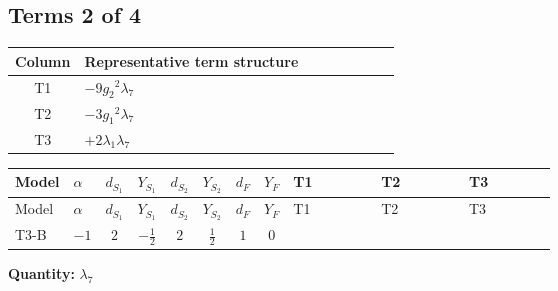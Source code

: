 \documentclass[8pt]{article}
\begin{document}
\begin{landscape}
\subsection*{Terms 2 of 4}
\begin{center}
\begin{tabular}{@{}c >{\raggedright\arraybackslash}p{0.82\linewidth}@{}}
\toprule
Column & Representative term structure \\
\midrule
T1 & \(\displaystyle -9 {g_2}^2 {\lambda_7}\) \\
\midrule
T2 & \(\displaystyle -3 {g_1}^2 {\lambda_7}\) \\
\midrule
T3 & \(\displaystyle +2 {\lambda_1} {\lambda_7}\) \\
\midrule
\bottomrule
\end{tabular}
\end{center}
\smallskip
\tiny
\begin{longtable}{@{}llcccccc >{\raggedright\arraybackslash}p{0.21\linewidth} >{\raggedright\arraybackslash}p{0.21\linewidth} >{\raggedright\arraybackslash}p{0.21\linewidth}@{}}
\toprule
Model & $\alpha$ & $d_{S_1}$ & $Y_{S_1}$ & $d_{S_2}$ & $Y_{S_2}$ & $d_F$ & $Y_F$ & T1 & T2 & T3 \\
\midrule
\endfirsthead
\toprule
Model & $\alpha$ & $d_{S_1}$ & $Y_{S_1}$ & $d_{S_2}$ & $Y_{S_2}$ & $d_F$ & $Y_F$ & T1 & T2 & T3 \\
\midrule
\endhead
T3-B & $-1$ & $2$ & $-\frac{1}{2}$ & $2$ & $\frac{1}{2}$ & $1$ & $0$ & \scriptsize\adjustbox{max width=\linewidth}{$\begin{gathered} -9 {g_2}^2 {\lambda_7}\end{gathered}$} & \scriptsize\adjustbox{max width=\linewidth}{$\begin{gathered} -3 {g_1}^2 {\lambda_7}\end{gathered}$} & \scriptsize\adjustbox{max width=\linewidth}{$\begin{gathered} +2 {\lambda_1} {\lambda_7}\end{gathered}$} \\
\midrule
\bottomrule
\end{longtable}
\clearpage
\noindent\textbf{Quantity: }$\lambda_{7}$\par\smallskip

\end{landscape}
\end{document}
